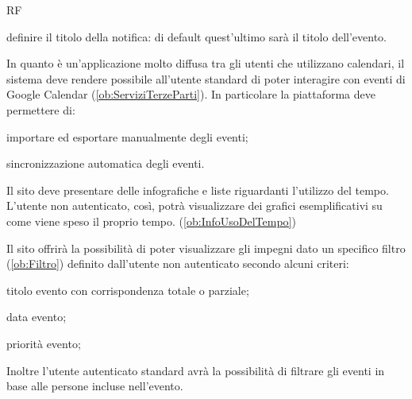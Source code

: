 \begin{listaPersonale}{RF}
\begin{listaPersonale2}[RF]{}
		 definire il titolo della notifica: di default quest'ultimo sarà il titolo dell'evento.
	\end{listaPersonale2}

	 In quanto è un'applicazione molto diffusa tra gli utenti che utilizzano calendari, il sistema deve rendere possibile all'utente standard di poter interagire con eventi di Google Calendar (\ref{ob:ServiziTerzeParti}). In particolare la piattaforma deve permettere di:
	\begin{listaPersonale2}[RF]{}
		 importare ed esportare manualmente degli eventi;

		 sincronizzazione automatica degli eventi.
	\end{listaPersonale2}

	 Il sito deve presentare delle infografiche e liste riguardanti l'utilizzo del tempo. L'utente non autenticato, così, potrà visualizzare dei grafici esemplificativi su come viene speso il proprio tempo. (\ref{ob:InfoUsoDelTempo})

	 Il sito offrirà la possibilità di poter visualizzare gli impegni dato un specifico filtro (\ref{ob:Filtro}) definito dall'utente non autenticato secondo alcuni criteri:
	\begin{listaPersonale2}[RF]{}
		 titolo evento con corrispondenza totale o parziale;

		 data evento;

		 priorità evento;
	\end{listaPersonale2}
	Inoltre l'utente autenticato standard avrà la possibilità di filtrare gli eventi in base alle persone incluse nell'evento.


\end{listaPersonale}
